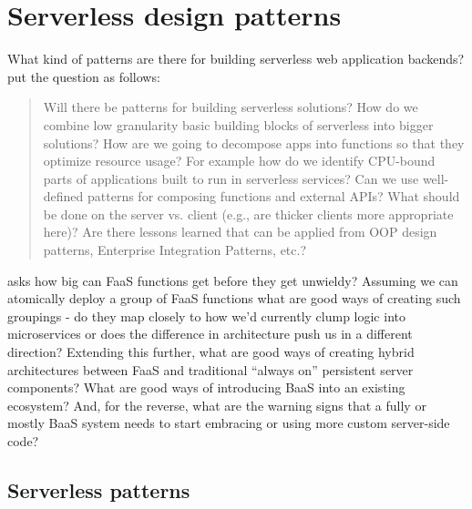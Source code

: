 \chapter{Serverless design patterns} \label{cha:patterns}

What kind of patterns are there for building serverless web application backends? \textcite{baldini17currentTrends} put the question as follows:

\begin{quote}
Will there be patterns for building serverless solutions? How do we combine low granularity basic building blocks of serverless into bigger solutions? How are we going to decompose apps into functions so that they optimize resource usage? For example how do we identify CPU-bound parts of applications built to run in serverless services? Can we use well-defined patterns for composing functions and external APIs? What should be done on the server vs. client (e.g., are thicker clients more appropriate here)? Are there lessons learned that can be applied from OOP design patterns, Enterprise Integration Patterns, etc.?
\end{quote}

\textcite{robert2016serverlessarchitectures} asks how big can FaaS functions get before they get unwieldy? Assuming we can atomically deploy a group of FaaS functions what are good ways of creating such groupings - do they map closely to how we’d currently clump logic into microservices or does the difference in architecture push us in a different direction? Extending this further, what are good ways of creating hybrid architectures between FaaS and traditional “always on” persistent server components? What are good ways of introducing BaaS into an existing ecosystem? And, for the reverse, what are the warning signs that a fully or mostly BaaS system needs to start embracing or using more custom server-side code?

\section{Serverless patterns} \label{sec:serverlessPatterns}



